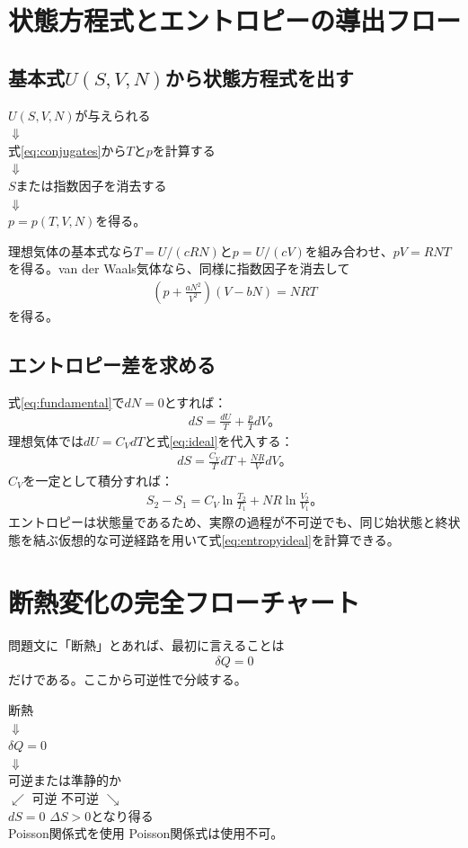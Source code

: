 \documentclass[platex,dvipdfmx,a4paper,10pt]{jsarticle}
\newcommand{\flow}[1]{\begin{center}\begin{minipage}{0.94\textwidth}\centering #1\end{minipage}\end{center}}
\begin{document}
\newpage
\section{状態方程式とエントロピーの導出フロー}\label{sec:eos-flow}
\subsection{基本式$U(S,V,N)$から状態方程式を出す}
\flow{$U(S,V,N)$が与えられる\\$\Downarrow$\\式\eqref{eq:conjugates}から$T$と$p$を計算する\\$\Downarrow$\\$S$または指数因子を消去する\\$\Downarrow$\\$p=p(T,V,N)$を得る。}
理想気体の基本式なら$T=U/(cRN)$と$p=U/(cV)$を組み合わせ、$pV=RNT$を得る。van der Waals気体なら、同様に指数因子を消去して
\begin{align}
  \left(p+\frac{aN^2}{V^2}\right)(V-bN)=NRT\label{eq:vdw}
\end{align}
を得る。

\subsection{エントロピー差を求める}
式\eqref{eq:fundamental}で$dN=0$とすれば：
\begin{align}
  dS=\frac{dU}{T}+\frac{p}{T}dV。\label{eq:dSgeneral}
\end{align}
理想気体では$dU=C_VdT$と式\eqref{eq:ideal}を代入する：
\begin{align}
  dS=\frac{C_V}{T}dT+\frac{NR}{V}dV。\label{eq:dSideal}
\end{align}
$C_V$を一定として積分すれば：
\begin{align}
  S_2-S_1=C_V\ln\frac{T_2}{T_1}+NR\ln\frac{V_2}{V_1}。\label{eq:entropyideal}
\end{align}
エントロピーは状態量であるため、実際の過程が不可逆でも、同じ始状態と終状態を結ぶ仮想的な可逆経路を用いて式\eqref{eq:entropyideal}を計算できる。

\newpage
\section{断熱変化の完全フローチャート}\label{sec:adiabatic-flow}
問題文に「断熱」とあれば、最初に言えることは
\begin{align}
  \delta Q=0\label{eq:adiabatic}
\end{align}
だけである。ここから可逆性で分岐する。
\flow{断熱\\$\Downarrow$\\$\delta Q=0$\\$\Downarrow$\\可逆または準静的か\\$\swarrow$ 可逆 \hspace{3em} 不可逆 $\searrow$\\$dS=0$ \hspace{5em} $\Delta S>0$となり得る\\Poisson関係式を使用 \hspace{2em} Poisson関係式は使用不可。}
\end{document}
